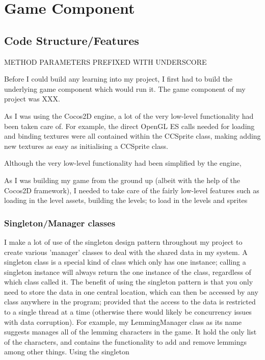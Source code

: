 \documentclass[a4paper,oneside]{report}
\begin{document}
\chapter{Game Component}
		
\section{Code Structure/Features}

METHOD PARAMETERS PREFIXED WITH UNDERSCORE

Before I could build any learning into my project, I first had to build the underlying game component which would run it. The game component of my project was XXX. 

As I was using the Cocos2D engine, a lot of the very low-level functionality had been taken care of. For example, the direct OpenGL ES calls needed for loading and binding textures were all contained within the CCSprite class, making adding new textures as easy as initialising a CCSprite class. 

Although the very low-level functionality had been simplified by the engine, 

As I was building my game from the ground up (albeit with the help of the Cocos2D framework), I needed to take care of the fairly low-level features such as loading in the level assets, building the levels; to load in the levels and sprites

\subsection{Singleton/Manager classes} I make a lot of use of the singleton design pattern throughout my project to create various 'manager' classes to deal with the shared data in my system. A singleton class is a special kind of class which only has one instance; calling a singleton instance will always return the one instance of the class, regardless of which class called it. The benefit of using the singleton pattern is that you only need to store the data in one central location, which can then be accessed by any class anywhere in the program; provided that the access to the data is restricted to a single thread at a time (otherwise there would likely be concurrency issues with data corruption). For example, my LemmingManager class as its name suggests manages all of the lemming characters in the game. It hold the only list of the characters, and contains the functionality to add and remove lemmings among other things. Using the singleton 
\end{document}
